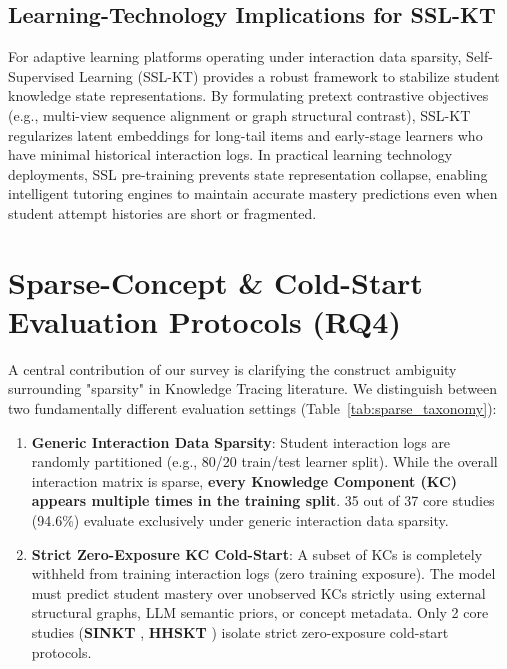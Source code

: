 \documentclass[10pt,journal,compsoc]{IEEEtran}
\begin{document}
\subsection{Learning-Technology Implications for SSL-KT}
For adaptive learning platforms operating under interaction data sparsity, Self-Supervised Learning (SSL-KT) provides a robust framework to stabilize student knowledge state representations. By formulating pretext contrastive objectives (e.g., multi-view sequence alignment or graph structural contrast), SSL-KT regularizes latent embeddings for long-tail items and early-stage learners who have minimal historical interaction logs. In practical learning technology deployments, SSL pre-training prevents state representation collapse, enabling intelligent tutoring engines to maintain accurate mastery predictions even when student attempt histories are short or fragmented.

\section{Sparse-Concept \& Cold-Start Evaluation Protocols (RQ4)}

A central contribution of our survey is clarifying the construct ambiguity surrounding "sparsity" in Knowledge Tracing literature. We distinguish between two fundamentally different evaluation settings (Table~\ref{tab:sparse_taxonomy}):
\begin{enumerate}
    \item \textbf{Generic Interaction Data Sparsity}: Student interaction logs are randomly partitioned (e.g., 80/20 train/test learner split). While the overall interaction matrix is sparse, \textbf{every Knowledge Component (KC) appears multiple times in the training split}. 35 out of 37 core studies (94.6\%) evaluate exclusively under generic interaction data sparsity.
    \item \textbf{Strict Zero-Exposure KC Cold-Start}: A subset of KCs is completely withheld from training interaction logs (zero training exposure). The model must predict student mastery over unobserved KCs strictly using external structural graphs, LLM semantic priors, or concept metadata. Only 2 core studies (\textbf{SINKT} \cite{KT044_SINKT_2024}, \textbf{HHSKT} \cite{KT035_HHSKT_2023}) isolate strict zero-exposure cold-start protocols.
\end{enumerate}
\end{document}
